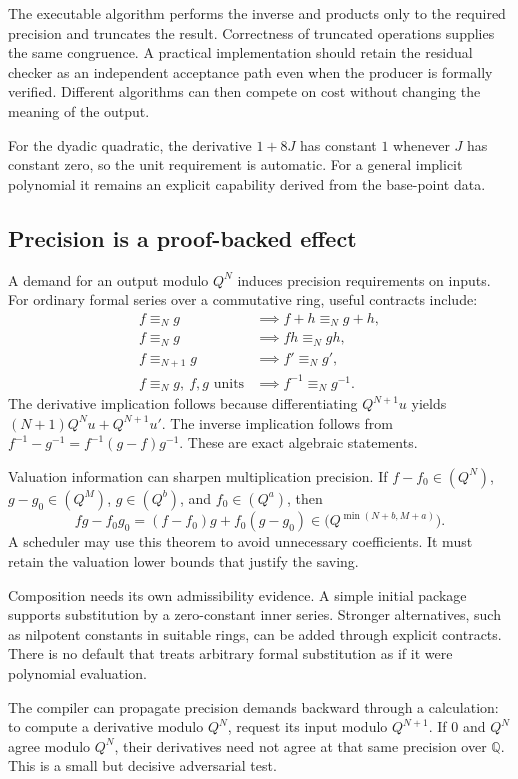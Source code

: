 \documentclass[11pt,letterpaper]{article}
\newcommand{\Q}{\mathbb Q}
\theoremstyle{definition}
\theoremstyle{remark}
\begin{document}
The executable algorithm performs the inverse and products only to the required
precision and truncates the result. Correctness of truncated operations supplies
the same congruence. A practical implementation should retain the residual
checker as an independent acceptance path even when the producer is formally
verified. Different algorithms can then compete on cost without changing the
meaning of the output.

For the dyadic quadratic, the derivative $1+8J$ has constant $1$ whenever $J$
has constant zero, so the unit requirement is automatic. For a general implicit
polynomial it remains an explicit capability derived from the base-point data.

\subsection{Precision is a proof-backed effect}
A demand for an output modulo $Q^N$ induces precision requirements on inputs.
For ordinary formal series over a commutative ring, useful contracts include:
\begin{align*}
 f\equiv_N g&\implies f+h\equiv_N g+h,\\
 f\equiv_N g&\implies fh\equiv_N gh,\\
 f\equiv_{N+1}g&\implies f'\equiv_N g',\\
 f\equiv_N g,\ f,g\text{ units}&\implies f^{-1}\equiv_N g^{-1}.
\end{align*}
The derivative implication follows because differentiating $Q^{N+1}u$ yields
$(N+1)Q^Nu+Q^{N+1}u'$. The inverse implication follows from
$f^{-1}-g^{-1}=f^{-1}(g-f)g^{-1}$. These are exact algebraic statements.

Valuation information can sharpen multiplication precision. If
$f-f_0\in(Q^N)$, $g-g_0\in(Q^M)$, $g\in(Q^b)$, and $f_0\in(Q^a)$, then
\[
 fg-f_0g_0=(f-f_0)g+f_0(g-g_0)
 \in\bigl(Q^{\min(N+b,M+a)}\bigr).
\]
A scheduler may use this theorem to avoid unnecessary coefficients. It must
retain the valuation lower bounds that justify the saving.

Composition needs its own admissibility evidence. A simple initial package
supports substitution by a zero-constant inner series. Stronger alternatives,
such as nilpotent constants in suitable rings, can be added through explicit
contracts. There is no default that treats arbitrary formal substitution as
if it were polynomial evaluation.

The compiler can propagate precision demands backward through a calculation:
to compute a derivative modulo $Q^N$, request its input modulo $Q^{N+1}$.
If $0$ and $Q^N$ agree modulo $Q^N$, their derivatives need not agree at that
same precision over $\Q$. This is a small but decisive adversarial test.
\end{document}
